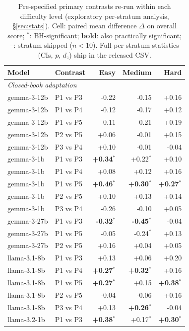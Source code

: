 \begin{table}[p]\centering\scriptsize
\caption{Pre-specified primary contrasts re-run within each difficulty level (exploratory per-stratum analysis, \S\ref{sec:stats}). Cell: paired mean difference $\Delta$ on overall score; $^{*}$: BH-significant; \textbf{bold}: also practically significant; --: stratum skipped ($n<10$). Full per-stratum statistics (CIs, $p$, $d_z$) ship in the released CSV.}
\label{tab:stratdiff}
\begin{tabular}{llrrr}
\toprule
Model & Contrast & Easy & Medium & Hard \\
\midrule \multicolumn{5}{l}{\textit{Closed-book adaptation}} \\ \midrule
gemma-3-12b & P1 vs P3 & -0.22 & -0.15 & +0.16 \\
gemma-3-12b & P1 vs P4 & -0.12 & -0.17 & +0.12 \\
gemma-3-12b & P1 vs P5 & -0.11 & -0.21 & +0.19 \\
gemma-3-12b & P2 vs P5 & +0.06 & -0.01 & +0.15 \\
gemma-3-12b & P3 vs P4 & +0.10 & -0.01 & -0.04 \\
gemma-3-1b & P1 vs P3 & \textbf{+0.34$^{*}$} & +0.22$^{*}$ & +0.10 \\
gemma-3-1b & P1 vs P4 & +0.08 & +0.12 & +0.16 \\
gemma-3-1b & P1 vs P5 & \textbf{+0.46$^{*}$} & \textbf{+0.30$^{*}$} & \textbf{+0.27$^{*}$} \\
gemma-3-1b & P2 vs P5 & +0.10 & +0.13 & +0.14 \\
gemma-3-1b & P3 vs P4 & -0.26 & -0.10 & +0.05 \\
gemma-3-27b & P1 vs P3 & \textbf{-0.32$^{*}$} & \textbf{-0.45$^{*}$} & -0.04 \\
gemma-3-27b & P1 vs P5 & -0.05 & -0.24$^{*}$ & +0.13 \\
gemma-3-27b & P2 vs P5 & +0.16 & +0.04 & +0.05 \\
llama-3.1-8b & P1 vs P3 & +0.13 & +0.06 & +0.20 \\
llama-3.1-8b & P1 vs P4 & \textbf{+0.27$^{*}$} & \textbf{+0.32$^{*}$} & +0.16 \\
llama-3.1-8b & P1 vs P5 & \textbf{+0.27$^{*}$} & +0.15 & \textbf{+0.38$^{*}$} \\
llama-3.1-8b & P2 vs P5 & -0.04 & -0.06 & +0.16 \\
llama-3.1-8b & P3 vs P4 & +0.13 & \textbf{+0.26$^{*}$} & -0.04 \\
llama-3.2-1b & P1 vs P3 & \textbf{+0.38$^{*}$} & +0.17$^{*}$ & \textbf{+0.30$^{*}$} \\

\end{tabular}
\end{table}
